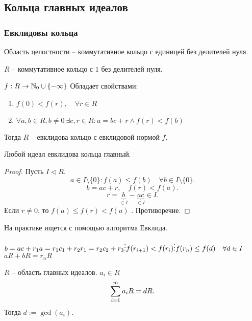 \documentclass[12pt]{report}
\begin{document}
\subsection{Кольца главных идеалов}
\subsubsection{Евклидовы кольца}
\begin{defn}
 	Область целостности -- коммутативное кольцо с единицей без делителей нуля.   
\end{defn}
\begin{name}
    $ R$ -- коммутативное кольцо с $ 1$ без делителей нуля.
\end{name}
\begin{defn}
    $ f: R \to  \mathbb{N}_0 \cup \{-\infty\}$ 
    Обладает свойствами:
    \begin{enumerate}
	\item $ f(0) < f(r), \quad \forall  r \in  R$
	\item $ \forall a, b \in  R, b\ne 0 ~ \exists  c, r \in R: a = b c + r \wedge f(r) < f(b)$
    \end{enumerate}
    Тогда $ R$ -- евклидова кольцо с евклидовой нормой  $ f$.
\end{defn}
\begin{thm}
    Любой идеал евклидова кольца главный.
\end{thm}
\begin{proof}
    Пусть $ I \triangleleft  R$. 
    \[
	a \in  I \setminus \{0\}: f(a) \le  f(b) \quad \forall  b \in  I \setminus \{0\}
    .\] 
    \[
	b = ac + r, \quad f(r) < f(a)
    .\] 
    \[
	r = \underbrace{b}_{\in I} - \underbrace{ac}_{ \in  I} \in  I 
    .\] 
    Если $r \ne 0$, то $ f(a) \le  f(r) < f(a)$ . Противоречие. 
\end{proof}
\begin{note}
    На практике ищется с помощью алгоритма Евклида.
\end{note}
\begin{st}
    $ b = ac + r_1 \\
    a = r_1 c_1 + r_2 \\
    r_1 = r_2 c_2 + r_3 \\
    \vdots\\
    f(r_{i+1}) < f(r_i)\\
    \vdots\\
    f(r_n)  \le f(d) \quad \forall  d \in  I$
    $ a R + b R = r_n R$
\end{st}
\begin{st}
    $ R$ -- область главных идеалов.
    $ a_i \in  R$
    \[
	\sum\limits_{i=1}^{m} a_i R = d R
    .\] 
    Тогда $ d:= \gcd(a_i)$.
\end{st}
\end{document}
